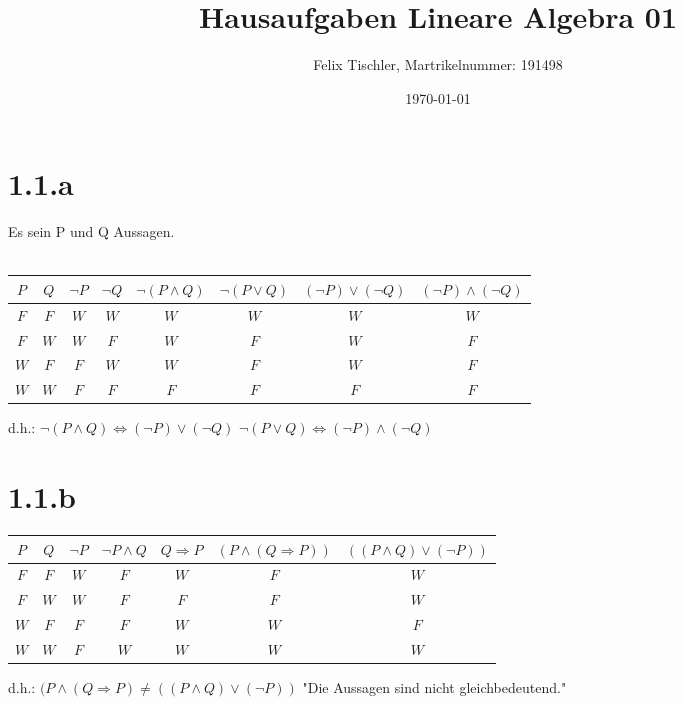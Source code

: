 \documentclass[titlepage]{article}
\newcommand{\n}{\newline}
\begin{document}
	
	\title{Hausaufgaben Lineare Algebra 01}
	\author{Felix Tischler, Martrikelnummer: 191498}
	\date{\today}
	\maketitle
	
	\section*{1.1.a}
		{
			Es sein P und Q Aussagen. \\ \\
			\begin{tabular}{cccc|cc|cc}
				$P$&$Q$&$\neg P$&$\neg Q$&$\neg (P\wedge Q)$&$\neg (P\vee Q)$&$(\neg P)\vee (\neg Q)$&$(\neg P)\wedge (\neg Q)$
				\\\hline
				$F$&$F$&$W$&$W$&$W$&$W$&$W$&$W$
				\\
				$F$&$W$&$W$&$F$&$W$&$F$&$W$&$F$		
				\\
				$W$&$F$&$F$&$W$&$W$&$F$&$W$&$F$
				\\
				$W$&$W$&$F$&$F$&$F$&$F$&$F$&$F$
			\end{tabular}
		}
		\n \n \n
		\hspace*{10mm} d.h.:
		\n \n
		\hspace*{20mm}
		$\neg (P\wedge Q)\Leftrightarrow (\neg P)\vee (\neg Q)$
		\n \n \hspace*{20mm}
		$\neg (P\vee Q)\Leftrightarrow (\neg P)\wedge (\neg Q)$
		
		\section*{1.1.b}
		{
			\centering
			\begin{tabular}{ccccc|cc}
				$P$&$Q$&$\neg P$&$\neg P\wedge Q$&$Q\Rightarrow P$&$(P\wedge (Q\Rightarrow P))$&$((P\wedge Q)\vee (\neg P))$
				\\\hline
				$F$&$F$&$W$&$F$&$W$&$F$&$W$
				\\
				$F$&$W$&$W$&$F$&$F$&$F$&$W$	
				\\
				$W$&$F$&$F$&$F$&$W$&$W$&$F$
				\\
				$W$&$W$&$F$&$W$&$W$&$W$&$W$
			\end{tabular}
		}
		\n \n \n
		\hspace*{10mm} d.h.:
		\n \n
		\hspace*{20mm}
		$(P\wedge (Q\Rightarrow P)\neq ((P\wedge Q)\vee (\neg P))$
		\n \n \hspace*{20mm}
		"Die Aussagen sind nicht gleichbedeutend."
		
\end{document}

